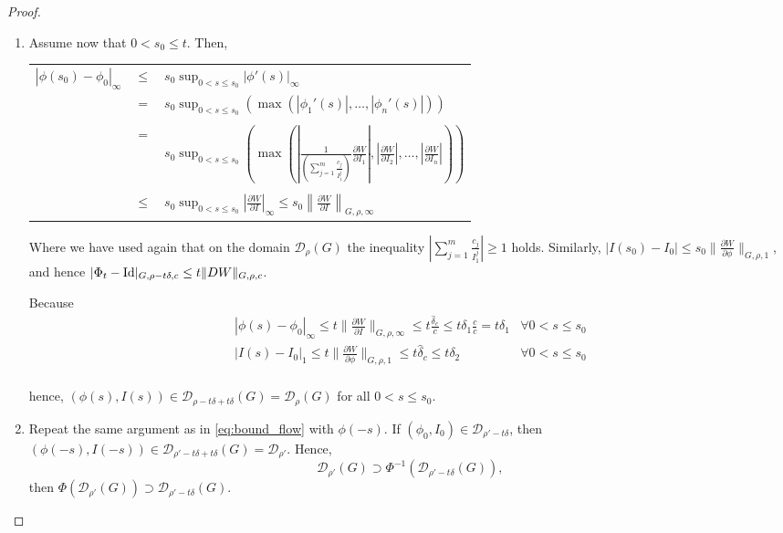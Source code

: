 \begin{proof}
\begin{enumerate}
\item

Assume now that $0<s_0 \leq t$. Then,

\begin{longtable}{rcl}
$|\phi(s_0)-\phi_0|_\infty $ & $\leq $ & $s_0\sup_{0<s\leq s_0}|\phi'(s)|_\infty $ \\
& $=$ & $s_0\sup_{0<s\leq s_0}\left(\max(|\phi_1'(s)|,\ldots,|\phi_n'(s)|)\right) $ \\
\\
& $=$ & $\displaystyle s_0\sup_{0<s\leq s_0}\left(\max\left(\left|\frac{1}{\left(\sum_{j=1}^m\frac{c_j}{I_1^j}\right)}\frac{\partial W}{\partial I_1}\right|,\left|\frac{\partial W}{\partial I_2}\right|,\ldots,\left|\frac{\partial W}{\partial I_n}\right|\right)\right)$ \\
\\
& $\leq$ & $s_0\sup_{0<s\leq s_0}\left|\frac{\partial W}{\partial I}\right|_\infty  \leq s_0\left\|\frac{\partial W}{\partial I}\right\|_{G,\rho,\infty}$ \\


\end{longtable}
Where we have used again that on the domain $\mathcal{D}_\rho(G)$ the inequality $\left|\sum_{j=1}^m\frac{c_j}{I_1^j}\right| \geq 1$ holds.
Similarly, $|I(s_0) - I_0| \leq s_0\|\frac{\partial W}{\partial \phi}\|_{G,\rho,1}$, and hence $|\Phi_t - \text{Id}|_{G,\rho-t\delta,c} \leq t\|D W\|_{G,\rho,c}$.

Because
\begin{equation}\label{eq:bound_flow}
\begin{array}{lr}
|\phi(s)-\phi_0|_\infty \leq t \|\frac{\partial W}{\partial I}\|_{G,\rho,\infty} \leq t \frac{\hat\delta_c}{c}\leq t\delta_1\frac{c}{c} = t\delta_1 & \forall 0 < s \leq s_0\\
|I(s)-I_0|_1 \leq t \|\frac{\partial W}{\partial \phi}\|_{G,\rho,1} \leq t \hat\delta_c\leq t\delta_2 & \forall 0 < s \leq s_0\\
\end{array}
\end{equation}


hence, $(\phi(s),I(s)) \in \mathcal{D}_{\rho-t\delta + t\delta}(G) = \mathcal{D}_\rho(G)$ for all $0 < s \leq s_0$.
\item

Repeat the same argument as in \ref{eq:bound_flow} with $\phi(-s)$. If $(\phi_0,I_0)\in \mathcal{D}_{\rho'-t\delta}$, then $(\phi(-s),I(-s)) \in \mathcal{D}_{\rho'-t\delta+t\delta}(G) = \mathcal{D}_{\rho'}$.
Hence, $$\mathcal{D}_{\rho'}(G) \supset \Phi^{-1}(\mathcal{D}_{\rho'-t\delta}(G)),$$ then $\Phi(\mathcal{D}_{\rho'}(G)) \supset \mathcal{D}_{\rho'-t\delta}(G)$.


\end{enumerate}
\end{proof}
